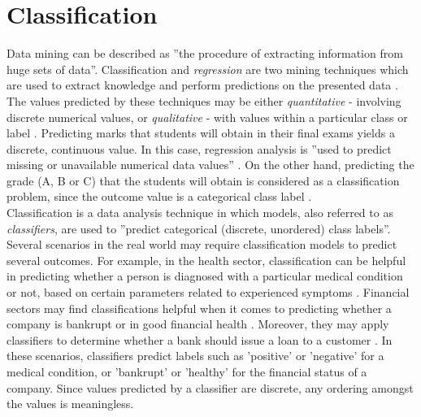 \chapter[Classification]{Classification}
\label{ch:classification}

Data mining can be described as ''the procedure of extracting information from huge sets of data''. Classification and \textit{regression} are two mining techniques which are used to extract knowledge and perform predictions on the presented data \citep{sagar2017}. The values predicted by these techniques may be either \textit{quantitative} - involving discrete numerical values, or \textit{qualitative} - with values within a particular class or label \citep{james2006}. Predicting marks that students will obtain in their final exams yields a discrete, continuous value. In this case, regression analysis is ''used to predict missing or unavailable numerical data values'' \citep{jiawei2011}. On the other hand, predicting the grade (A, B or C) that the students will obtain is considered as a classification problem, since the outcome value is a categorical class label \citep{jiawei2011}.\\

Classification is a data analysis technique in which models, also referred to as \textit{classifiers}, are used to ''predict categorical (discrete, unordered) class labels''. Several scenarios in the real world may require classification models to predict several outcomes. For example, in the health sector, classification can be helpful in predicting whether a person is diagnosed with a particular medical condition or not, based on certain parameters related to experienced symptoms \citep{venkata2011,alzahani2015}. Financial sectors may find classifications helpful when it comes to predicting whether a company is bankrupt or in good financial health \citep{moradi2012}. Moreover, they may apply classifiers to determine whether a bank should issue a loan to a customer \citep{thomas2000}. In these scenarios, classifiers predict labels such as 'positive' or 'negative' for a medical condition, or 'bankrupt' or 'healthy' for the financial status of a company. Since values predicted by a classifier are discrete, any ordering amongst the values is meaningless. 

